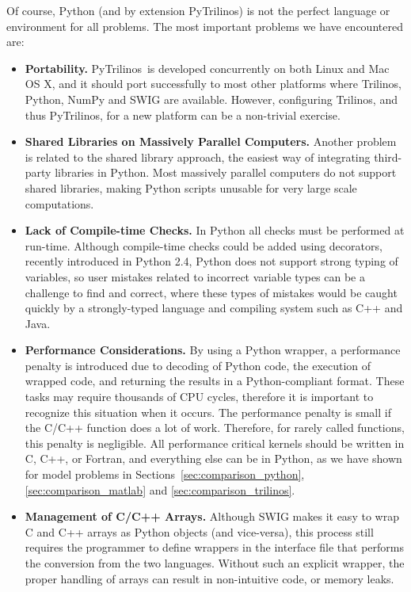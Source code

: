 \documentclass[acmtocl]{acmtrans2m}
\newcommand{\PyTrilinos}{{PyTrilinos}}
\begin{document}
\smallskip

Of course, Python (and by extension \PyTrilinos) is not the perfect
language or environment for all problems.  The most important problems
we have encountered are:

\begin{itemize}

\item {\bf Portability.} \PyTrilinos\ is developed concurrently on
  both Linux and Mac OS X, and it should port successfully to most
  other platforms where Trilinos, Python, NumPy and SWIG are
  available.  However, configuring Trilinos, and thus \PyTrilinos, for
  a new platform can be a non-trivial exercise.

\item {\bf Shared Libraries on Massively Parallel Computers.} Another
  problem is related to the shared library approach, the
  easiest way of integrating third-party libraries in Python.  Most
  massively parallel computers do not support shared libraries,
  making Python scripts unusable for very large scale
  computations.

\item {\bf Lack of Compile-time Checks.} In Python all checks must be
  performed at run-time.    Although compile-time checks could be added using
  decorators, recently introduced in Python 2.4, Python does not support strong
  typing of variables, so user mistakes related to incorrect variable types can
  be a challenge to find and correct, where these types of mistakes would be
  caught quickly by a strongly-typed language and compiling system such as C++
  and Java.

\item {\bf Performance Considerations.}  By using a Python wrapper, a
  performance penalty is introduced due to decoding of Python code,
  the execution of wrapped code, and returning the results in a
  Python-compliant format.  These tasks may require thousands of CPU
  cycles, therefore it is important to recognize this situation when
  it occurs.  The performance penalty is small if the C/C++ function
  does a lot of work.  Therefore, for rarely called functions, this
  penalty is negligible.  All performance critical kernels should be
  written in C, C++, or Fortran, and everything else can be in Python,
  as we have shown for model problems in
  Sections~\ref{sec:comparison_python}, \ref{sec:comparison_matlab}
  and \ref{sec:comparison_trilinos}.

\item {\bf Management of C/C++ Arrays.} Although SWIG makes it easy to
  wrap C and C++ arrays as Python objects (and vice-versa), this
  process still requires the programmer to define wrappers in the
  interface file that performs the conversion from the two languages.
  Without such an explicit wrapper, the proper handling of
  arrays can result in non-intuitive code, or memory leaks.


\end{itemize}
\end{document}
